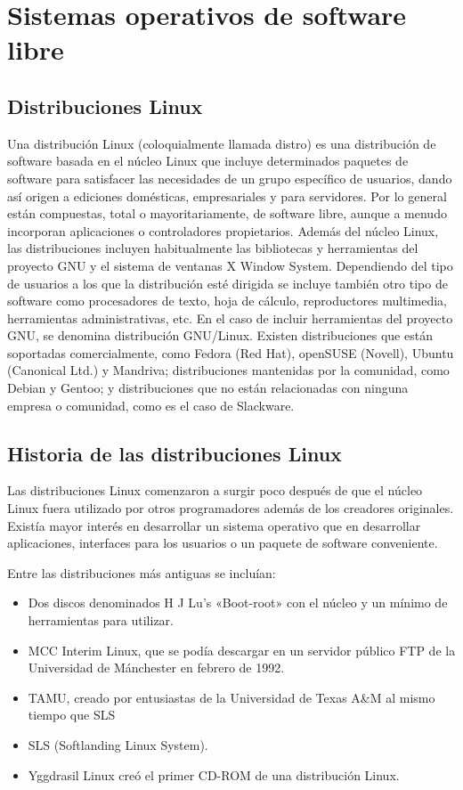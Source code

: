 \chapter{Sistemas operativos de software libre}

\section{Distribuciones Linux}
Una distribución Linux (coloquialmente llamada distro) es una distribución de software basada en el núcleo Linux que incluye determinados paquetes de software para satisfacer las necesidades de un grupo específico de usuarios, dando así origen a ediciones domésticas, empresariales y para servidores. Por lo general están compuestas, total o mayoritariamente, de software libre, aunque a menudo incorporan aplicaciones o controladores propietarios.
Además del núcleo Linux, las distribuciones incluyen habitualmente las bibliotecas y herramientas del proyecto GNU y el sistema de ventanas X Window System. Dependiendo del tipo de usuarios a los que la distribución esté dirigida se incluye también otro tipo de software como procesadores de texto, hoja de cálculo, reproductores multimedia, herramientas administrativas, etc. En el caso de incluir herramientas del proyecto GNU, se denomina distribución GNU/Linux.
Existen distribuciones que están soportadas comercialmente, como Fedora (Red Hat), openSUSE (Novell), Ubuntu (Canonical Ltd.) y Mandriva; distribuciones mantenidas por la comunidad, como Debian y Gentoo; y distribuciones que no están relacionadas con ninguna empresa o comunidad, como es el caso de Slackware.

\section{Historia de las distribuciones Linux}
Las distribuciones Linux comenzaron a surgir poco después de que el núcleo Linux fuera utilizado por otros programadores además de los creadores originales. Existía mayor interés en desarrollar un sistema operativo que en desarrollar aplicaciones, interfaces para los usuarios o un paquete de software conveniente.

Entre las distribuciones más antiguas se incluían:

\begin{itemize}
\item Dos discos denominados H J Lu's «Boot-root» con el núcleo y un mínimo de herramientas para utilizar.
\item MCC Interim Linux, que se podía descargar en un servidor público FTP de la Universidad de Mánchester en febrero de 1992.
\item TAMU, creado por entusiastas de la Universidad de Texas A\&M al mismo tiempo que SLS
\item SLS (Softlanding Linux System).
\item Yggdrasil Linux creó el primer CD-ROM de una distribución Linux.
\end{itemize}

